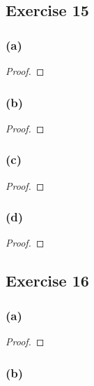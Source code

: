 \documentclass[14pt]{extarticle}
\begin{document}
\subsection{Exercise 15}

\subsubsection{(a)}

\begin{proof}

\end{proof}

\subsubsection{(b)}

\begin{proof}

\end{proof}

\subsubsection{(c)}

\begin{proof}

\end{proof}

\subsubsection{(d)}

\begin{proof}

\end{proof}

\subsection{Exercise 16}

\subsubsection{(a)}

\begin{proof}

\end{proof}

\subsubsection{(b)}
\end{document}
